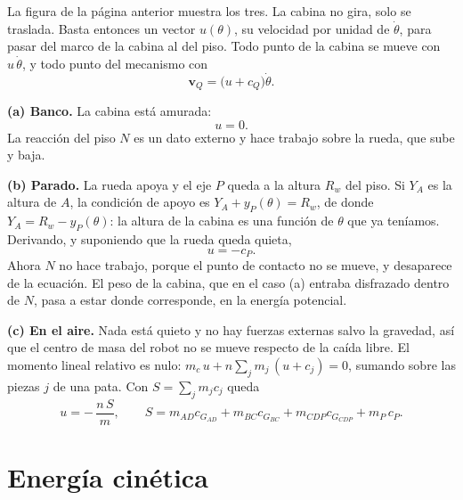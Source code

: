 \documentclass[11pt,a4paper]{article}
\begin{document}
La figura de la página anterior muestra los tres. La cabina no gira, solo se traslada. Basta entonces un vector \(u(\theta)\), su velocidad por unidad de
\(\dot\theta\), para pasar del marco de la cabina al del piso. Todo punto de la cabina se mueve con
\(u\,\dot\theta\), y todo punto del mecanismo con
\begin{equation}
\mathbf{v}_Q=\bigl(u+c_Q\bigr)\dot\theta .
\label{eq:vpiso}
\end{equation}

\textbf{(a) Banco.} La cabina está amurada:
\begin{equation}
u=0 .
\label{eq:ubanco}
\end{equation}
La reacción del piso \(N\) es un dato externo y hace trabajo sobre la rueda, que sube y baja.

\textbf{(b) Parado.} La rueda apoya y el eje \(P\) queda a la altura \(R_w\) del piso. Si \(Y_A\) es la altura
de \(A\), la condición de apoyo es \(Y_A+y_P(\theta)=R_w\), de donde \(Y_A=R_w-y_P(\theta)\): la altura de la
cabina es una función de \(\theta\) que ya teníamos. Derivando, y suponiendo que la rueda queda quieta,
\begin{equation}
u=-c_P .
\label{eq:uparado}
\end{equation}
Ahora \(N\) no hace trabajo, porque el punto de contacto no se mueve, y desaparece de la ecuación. El peso de
la cabina, que en el caso (a) entraba disfrazado dentro de \(N\), pasa a estar donde corresponde, en la
energía potencial.

\textbf{(c) En el aire.} Nada está quieto y no hay fuerzas externas salvo la gravedad, así que el centro de
masa del robot no se mueve respecto de la caída libre. El momento lineal relativo es nulo:
\(m_c\,u+n\sum_j m_j\,(u+c_j)=0\), sumando sobre las piezas \(j\) de una pata. Con
\(S=\sum_j m_j c_j\) queda
\begin{equation}
u=-\,\frac{n\,S}{m},\qquad S=m_{AD}c_{G_{AD}}+m_{BC}c_{G_{BC}}+m_{CDP}c_{G_{CDP}}+m_P\,c_P .
\label{eq:uaire}
\end{equation}

\section{Energía cinética}
\end{document}
